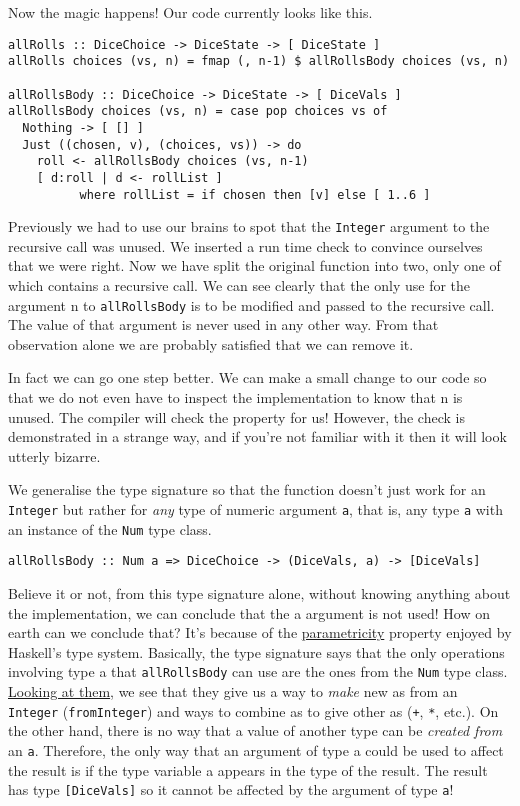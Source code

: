 Now the magic happens! Our code currently looks like this.

\begin{verbatim}
allRolls :: DiceChoice -> DiceState -> [ DiceState ]
allRolls choices (vs, n) = fmap (, n-1) $ allRollsBody choices (vs, n)

allRollsBody :: DiceChoice -> DiceState -> [ DiceVals ]
allRollsBody choices (vs, n) = case pop choices vs of
  Nothing -> [ [] ]
  Just ((chosen, v), (choices, vs)) -> do
    roll <- allRollsBody choices (vs, n-1)
    [ d:roll | d <- rollList ]
          where rollList = if chosen then [v] else [ 1..6 ]
\end{verbatim}
Previously we had to use our brains to spot that the \texttt{Integer} argument to the recursive call was unused. We inserted a run time check to convince ourselves that we were right. Now we have split the original function into two, only one of which contains a recursive call. We can see clearly that the only use for the argument n to \texttt{allRollsBody} is to be modified and passed to the recursive call. The value of that argument is never used in any other way. From that observation alone we are probably satisfied that we can remove it.

In fact we can go one step better. We can make a small change to our code so that we do not even have to inspect the implementation to know that n is unused. The compiler will check the property for us! However, the check is demonstrated in a strange way, and if you're not familiar with it then it will look utterly bizarre.

We generalise the type signature so that the function doesn't just work for an \texttt{Integer} but rather for \textit{any} type of numeric argument \texttt{a}, that is, any type \texttt{a} with an instance of the \texttt{Num} type class.

\begin{verbatim}
allRollsBody :: Num a => DiceChoice -> (DiceVals, a) -> [DiceVals]
\end{verbatim}
Believe it or not, from this type signature alone, without knowing anything about the implementation, we can conclude that the a argument is not used! How on earth can we conclude that? It's because of the \href{https://en.wikipedia.org/wiki/Parametricity}{parametricity} property enjoyed by Haskell's type system. Basically, the type signature says that the only operations involving type a that \texttt{allRollsBody} can use are the ones from the \texttt{Num} type class. \href{https://www.stackage.org/haddock/lts-13.21/base-4.12.0.0/Prelude.html#t:Num}{Looking at them}, we see that they give us a way to \textit{make} new as from an \texttt{Integer} (\texttt{fromInteger}) and ways to combine as to give other as (\texttt{+}, \texttt{*}, etc.). On the other hand, there is no way that a value of another type can be \textit{created from} an \texttt{a}. Therefore, the only way that an argument of type a could be used to affect the result is if the type variable a appears in the type of the result. The result has type \texttt{[DiceVals]} so it cannot be affected by the argument of type \texttt{a}!

